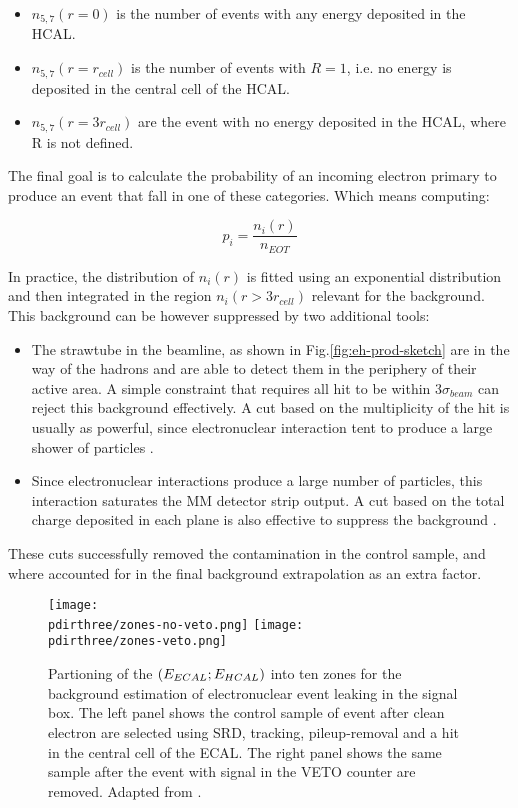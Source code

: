 \begin{itemize}
\item $n_{5,7}(r=0)$ is the number of events with any energy deposited in the HCAL.
\item $n_{5,7}(r=r_{cell})$ is the number of events with $R=1$, i.e. no energy is deposited in the central cell of the HCAL.
\item $n_{5,7}(r=3r_{cell})$ are the event with no energy deposited in the HCAL, where R is not defined.
\end{itemize}

The final goal is to calculate the probability of an incoming electron primary to produce an event that fall in one of these categories. Which means computing:

\begin{equation}
  \label{eq:enucl-prob}
  p_i = \frac{n_i(r)}{n_{EOT}}
\end{equation}

In practice, the distribution of $n_{i}(r)$ is fitted using an exponential distribution and then integrated in the region $n_i(r>3r_{cell})$ relevant for the background. This background can be however suppressed by two additional tools:

\begin{itemize}
\item The strawtube in the beamline, as shown in Fig.\ref{fig:eh-prod-sketch} are in the way of the hadrons and are able to detect them in the periphery of their active area. A simple constraint that requires all hit to be within 3$\sigma_{beam}$ can reject this background effectively. A cut based on the multiplicity of the hit is usually as powerful, since electronuclear interaction tent to produce a large shower of particles \cite{pdegen-thesis}.
\item Since electronuclear interactions produce a large number of particles, this interaction saturates the MM detector strip output. A cut based on the total charge deposited in each plane is also effective to suppress the background \cite{na64-invisible-cuts}.
\end{itemize}

These cuts successfully removed the contamination in the control sample, and where accounted for in the final background extrapolation as an extra factor.


\begin{figure}[tbh!]
  \centering
  \texttt{[image: \\pdirthree/zones-no-veto.png]}
  \texttt{[image: \\pdirthree/zones-veto.png]}
  \caption[electronuclear background estimation]{Partioning of the $(E_{ECAL};E_{HCAL})$ into ten zones for the background estimation of electronuclear event leaking in the signal box. The left panel shows the control sample of event after clean electron are selected using SRD, tracking, pileup-removal and a hit in the central cell of the ECAL. The right panel shows the same sample after the event with signal in the VETO counter are removed. Adapted from \cite{na64-neutrals-study}.}
  \label{fig:enucl-bkg-estimation}
\end{figure}

